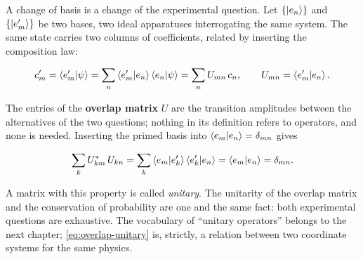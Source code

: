 A change of basis is a change of the experimental question. Let $\{\ket{e_n}\}$ and $\{\ket{e'_m}\}$ be two bases, two ideal apparatuses interrogating the same system. The same state carries two columns of coefficients, related by inserting the composition law:
\begin{linenomath}
    \begin{equation}
        c'_m=\braket{e'_m|\psi}=\sum_n\braket{e'_m|e_n}\braket{e_n|\psi}=\sum_n U_{mn}\,c_n,
        \qquad
        U_{mn}=\braket{e'_m|e_n}.
        \label{eq:overlap}
    \end{equation}
\end{linenomath}
The entries of the \textbf{overlap matrix} $U$ are the transition amplitudes between the alternatives of the two questions; nothing in its definition refers to operators, and none is needed. Inserting the primed basis into $\braket{e_m|e_n}=\delta_{mn}$ gives
\begin{linenomath}
    \begin{equation}
        \sum_k U^{*}_{km}\,U_{kn}
        =\sum_k\braket{e_m|e'_k}\braket{e'_k|e_n}
        =\braket{e_m|e_n}
        =\delta_{mn}.
        \label{eq:overlap-unitary}
    \end{equation}
\end{linenomath}
A matrix with this property is called \emph{unitary}. The unitarity of the overlap matrix and the conservation of probability are one and the same fact: both experimental questions are exhaustive. The vocabulary of ``unitary operators'' belongs to the next chapter; \eqref{eq:overlap-unitary} is, strictly, a relation between two coordinate systems for the same physics.

